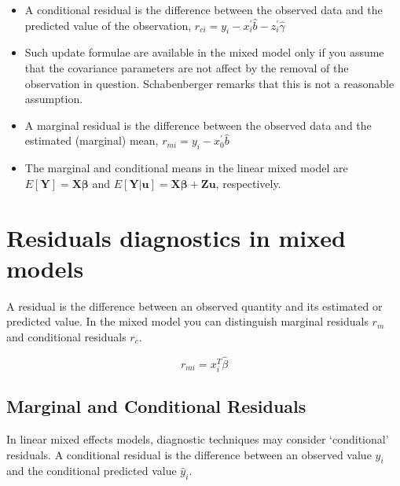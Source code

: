 \documentclass[Main.tex]{subfiles}
\begin{document}
\begin{itemize}
\item A conditional residual is the difference between the observed data and the predicted value of the observation,
$r_{ci} = y_i - x_i^{\prime} \hat{b} - z_i^{\prime} \hat{\gamma}$

	
\item Such update formulae are available in the mixed model only if you assume that the covariance parameters are not affect by the removal of the observation in question. Schabenberger remarks that this is not a reasonable assumption.
	
\item A marginal residual is the difference between the observed data and the estimated (marginal) mean, $r_{mi} = y_i - x_0^{\prime} \hat{b}$
		
\item The marginal and conditional means in the linear mixed model are
	$E[\boldsymbol{Y}] = \boldsymbol{X}\boldsymbol{\beta}$ and
	$E[\boldsymbol{Y|\boldsymbol{u}}] = \boldsymbol{X}\boldsymbol{\beta} + \boldsymbol{Z}\boldsymbol{u}$, respectively.
\end{itemize} 
	

\section{Residuals diagnostics in mixed models}


A residual is the difference between an observed quantity and its estimated or predicted value. In the mixed
model you can distinguish marginal residuals $r_m$ and conditional residuals $r_c$. 



\begin{equation}
r_{mi}=x^{T}_{i}\hat{\beta}
\end{equation}






\subsection{Marginal and Conditional Residuals}

In linear mixed effects models, diagnostic techniques may consider `conditional' residuals. A conditional residual is the difference between an observed value $y_{i}$ and the conditional predicted value $\hat{y}_{i} $.
\end{document}
